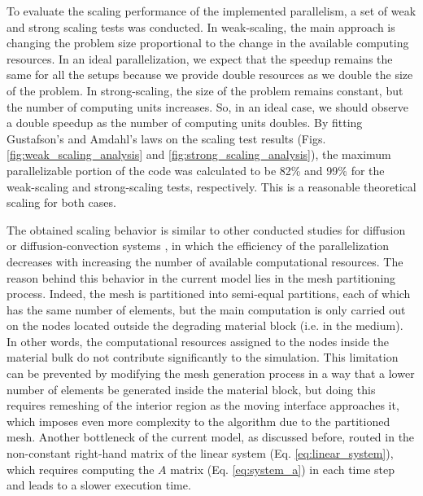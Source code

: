 To evaluate the scaling performance of the implemented parallelism, a set of weak and strong scaling tests was conducted. In weak-scaling, the main approach is changing the problem size proportional to the change in the available computing resources. In an ideal parallelization, we expect that the speedup remains the same for all the setups because we provide double resources as we double the size of the problem. In strong-scaling, the size of the problem remains constant, but the number of computing units increases. So, in an ideal case, we should observe a double speedup as the number of computing units doubles.
By fitting Gustafson's and Amdahl's laws on the scaling test results (Figs. \ref{fig:weak_scaling_analysis} and \ref{fig:strong_scaling_analysis}), the maximum parallelizable portion of the code was calculated to be 82\% and 99\% for the weak-scaling and strong-scaling tests, respectively. This is a reasonable theoretical scaling for both cases.

The obtained scaling behavior is similar to other conducted  studies for diffusion or diffusion-convection systems \cite{Hassan2011,Rettinger2017}, in which the efficiency of the parallelization decreases with increasing the number of available computational resources. The reason behind this behavior in the current model lies in the mesh partitioning process. Indeed, the mesh is partitioned into semi-equal partitions, each of which has the same number of elements, but the main computation is only carried out on the nodes located outside the degrading material block (i.e. in the medium). In other words, the computational resources assigned to the nodes inside the material bulk do not contribute significantly to the simulation. This limitation can be prevented by modifying the mesh generation process in a way that a lower number of elements be generated inside the material block, but doing this requires remeshing of the interior region as the moving interface approaches it, which imposes even more complexity to the algorithm due to the partitioned mesh. Another bottleneck of the current model, as discussed before, routed in the non-constant right-hand matrix of the linear system (Eq. \ref{eq:linear_system}), which requires computing the $A$ matrix (Eq. \ref{eq:system_a}) in each time step and leads to a slower execution time.

